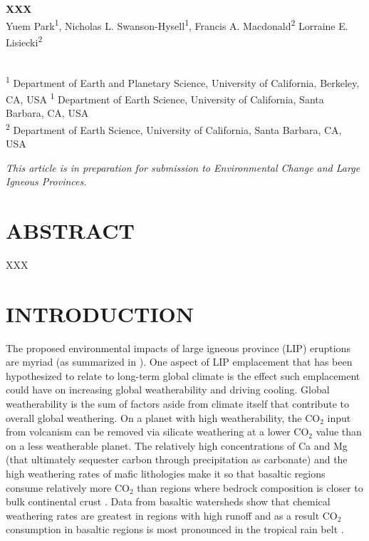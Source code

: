 \documentclass[11pt,letterpaper]{article}
\begin{document}
\begin{flushleft}
{\Large \textbf{XXX}}
\\
Yuem Park\textsuperscript{1},
Nicholas L. Swanson-Hysell\textsuperscript{1},
Francis A. Macdonald\textsuperscript{2}
Lorraine E. Lisiecki\textsuperscript{2}

\\
\bigskip
\textsuperscript{1} Department of Earth and Planetary Science, University of California, Berkeley, CA, USA
\textsuperscript{1} Department of Earth Science, University of California, Santa Barbara, CA, USA
\\
\textsuperscript{2} Department of Earth Science, University of California, Santa Barbara, CA, USA
\bigskip

\end{flushleft}

\noindent\textit{This article is in preparation for submission to \textit{Environmental Change and Large Igneous Provinces}.}

\linenumbers

\section*{ABSTRACT \label{sec:ABSTRACT}}

XXX

\section*{INTRODUCTION \label{sec:INTRODUCTION}}

The proposed environmental impacts of large igneous province (LIP) eruptions are myriad (as summarized in \citealp{Ernst2017}). One aspect of LIP emplacement that has been hypothesized to relate to long-term global climate is the effect such emplacement could have on increasing global weatherability and driving cooling. Global weatherability is the sum of factors aside from climate itself that contribute to overall global weathering. On a planet with high weatherability, the CO$_2$ input from volcanism can be removed via silicate weathering at a lower CO$_2$ value than on a less weatherable planet. The relatively high concentrations of Ca and Mg (that ultimately sequester carbon through precipitation as carbonate) and the high weathering rates of mafic lithologies make it so that basaltic regions consume relatively more CO$_2$ than regions where bedrock composition is closer to bulk continental crust \citep{Dessert2003a}. Data from basaltic watersheds show that chemical weathering rates are greatest in regions with high runoff and as a result CO$_2$ consumption in basaltic regions is most pronounced in the tropical rain belt \citep{Dessert2003a, Hartmann2014a}.
\end{document}
